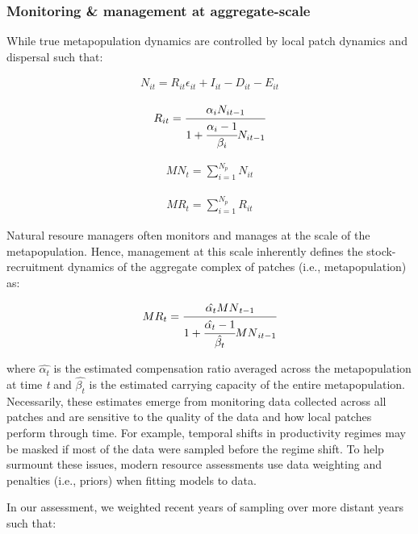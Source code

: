 \documentclass[]{article}
\begin{document}
\hypertarget{monitoring-management-at-aggregate-scale}{%
\subsubsection{Monitoring \& management at
aggregate-scale}\label{monitoring-management-at-aggregate-scale}}

While true metapopulation dynamics are controlled by local patch
dynamics and dispersal such that:

\begin{align}
N_{it}= R_{it}\epsilon_{it}+I_{it}-D_{it}-E_{it}
\end{align}

\begin{align}
R_{it}=\cfrac{\alpha_iN_{it-1}}{1+\cfrac{\alpha_i-1}{\beta_i}N_{it-1}}
\end{align}

\begin{align}
{MN}_t = \sum_{i=1}^{N_p} N_{it}
\end{align}

\begin{align}
{MR}_t = \sum_{i=1}^{N_p} R_{it}
\end{align}

Natural resoure managers often monitors and manages at the scale of the
metapopulation. Hence, management at this scale inherently defines the
stock-recruitment dynamics of the aggregate complex of patches (i.e.,
metapopulation) as:

\begin{align}
{MR}_{t}=\cfrac{\hat{\alpha_t}{MN}_{t-1}}{1+\cfrac{\hat{\alpha_t}-1}{\hat{\beta_t}}{MN}_{it-1}}
\end{align}

where \(\hat{\alpha_t}\) is the estimated compensation ratio averaged
across the metapopulation at time \emph{t} and \(\hat{\beta_t}\) is the
estimated carrying capacity of the entire metapopulation. Necessarily,
these estimates emerge from monitoring data collected across all patches
and are sensitive to the quality of the data and how local patches
perform through time. For example, temporal shifts in productivity
regimes may be masked if most of the data were sampled before the regime
shift. To help surmount these issues, modern resource assessments use
data weighting and penalties (i.e., priors) when fitting models to data.

In our assessment, we weighted recent years of sampling over more
distant years such that:
\end{document}
